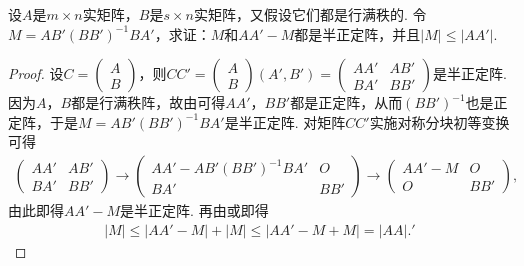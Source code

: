 \documentclass[../../main.tex]{subfiles}
\begin{document}
\begin{example}\label{example:例9.81}
设\(A\)是\(m\times n\)实矩阵，\(B\)是\(s\times n\)实矩阵，又假设它们都是行满秩的. 令\(M = AB'(BB')^{-1}BA'\)，求证：\(M\)和\(AA' - M\)都是半正定阵，并且\(\vert M\vert\leqslant \vert AA'\vert\).
\end{example}
\begin{proof}
设\(C=\begin{pmatrix}A\\B\end{pmatrix}\)，则\(CC'=\begin{pmatrix}A\\B\end{pmatrix}(A',B')=\begin{pmatrix}AA'&AB'\\BA'&BB'\end{pmatrix}\)是半正定阵. 因为\(A\)，\(B\)都是行满秩阵，故由可得\(AA'\)，\(BB'\)都是正定阵，从而\((BB')^{-1}\)也是正定阵，于是\(M = AB'(BB')^{-1}BA'\)是半正定阵. 对矩阵\(CC'\)实施对称分块初等变换可得
\begin{align*}
\begin{pmatrix}AA'&AB'\\BA'&BB'\end{pmatrix}\to\begin{pmatrix}AA' - AB'(BB')^{-1}BA'&O\\BA'&BB'\end{pmatrix}\to\begin{pmatrix}AA' - M&O\\O&BB'\end{pmatrix},
\end{align*}
由此即得\(AA' - M\)是半正定阵. 再由或即得
\begin{align*}
\left| M \right|\leqslant \left| AA' -M \right|+\left| M \right|\leqslant \left| AA'-M+M \right|=\left| AA\right|.
'\end{align*}

\end{proof}
\end{document}
